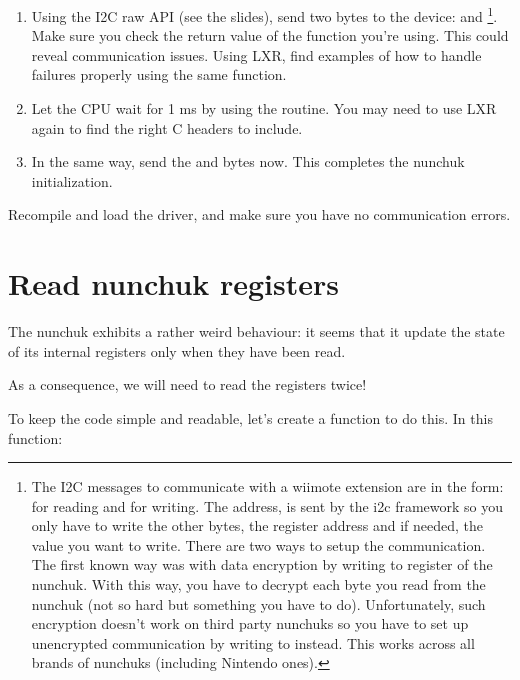 \begin{enumerate}
\item Using the I2C raw API (see the slides), send two bytes to the
      device:  and 
      \footnote{The I2C messages to communicate with a wiimote
        extension are in the form: 
        for reading and  for
        writing. The address,  is sent by the i2c framework
        so you only have to write the other bytes, the register
        address and if needed, the value you want to write. There are
        two ways to setup the communication. The first known way was
        with data encryption by writing  to register
         of the nunchuk.  With this way, you have to
        decrypt each byte you read from the nunchuk (not so hard but
        something you have to do).  Unfortunately, such encryption
        doesn't work on third party nunchuks so you have to set up
        unencrypted communication by writing  to
         instead. This works across all brands of nunchuks
        (including Nintendo ones).}.
      Make sure you check the return value of the function you're
      using. This could reveal communication issues.  Using LXR, find
      examples of how to handle failures properly using the same
      function.
\item Let the CPU wait for 1 ms by using the  routine.
      You may need to use LXR again to find the right C headers to
      include.
\item In the same way, send the  and  bytes now. 
      This completes the nunchuk initialization.
\end{enumerate}

Recompile and load the driver, and make sure you have no communication
errors.

\section{Read nunchuk registers}

The nunchuk exhibits a rather weird behaviour: it seems that it update
the state of its internal registers only when they have been read.

As a consequence, we will need to read the registers twice!

To keep the code simple and readable, let's create a
 function to do this. In this function:

